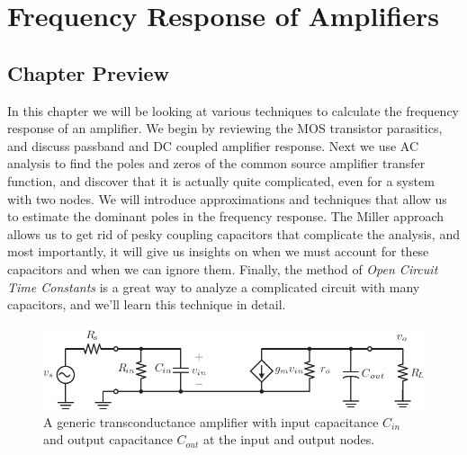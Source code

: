 \chapter{Frequency Response of Amplifiers}
\label{ch:ch14_freq_resp}
\graphicspath{{./figures/figs_ch14_freq_resp/}}
\section{Chapter Preview}
In this chapter we will be looking at various techniques to calculate the frequency response of an amplifier.  We begin by reviewing the MOS transistor parasitics, and discuss passband and DC coupled amplifier response.  Next we use AC analysis to find the poles and zeros of the common source amplifier transfer function, and discover that it is actually quite complicated, even for a system with two nodes.  We will introduce approximations and techniques that allow us to estimate the dominant poles in the frequency response.  The Miller approach allows us to get rid of pesky coupling capacitors that complicate the analysis, and most importantly, it will give us insights on when we must account for these capacitors and when we can ignore them.  Finally, the method of \emph{Open Circuit Time Constants} is a great way to analyze a complicated circuit with many capacitors, and we'll learn this technique in detail.
\newpage
\begin{figure}[t]
\centering
\includegraphics[scale=1.25]{amp_two_poles}
\caption{A generic transconductance amplifier with input capacitance $C_{in}$ and output capacitance $C_{out}$ at the input and output nodes.}
\label{fig:amp_two_poles_indep}
\end{figure}
